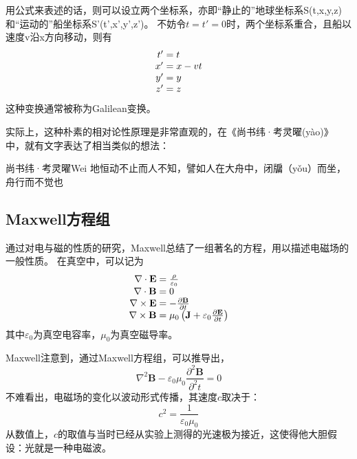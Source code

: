 用公式来表述的话，则可以设立两个坐标系，亦即“静止的”地球坐标系S(t,x,y,z)和“运动的”船坐标系S'(t',x',y',z')。
不妨令$t=t'=0$时，两个坐标系重合，且船以速度v沿x方向移动，则有
\begin{equation}
\begin{array}{r@{}l}
t' &{}= t \\
x' &{}= x-vt\\
y' &{}= y \\
z' &{}= z 
\end{array}\label{eq:galileo}
\end{equation}
这种变换通常被称为Galilean变换。

实际上，这种朴素的相对论性原理是非常直观的，在《尚书纬·考灵曜(y{\` a}o)》中，就有文字表达了相当类似的想法：
\begin{myprop}{尚书纬·考灵曜}{Wei}
地恒动不止而人不知，譬如人在大舟中，闭牖（y{\v o}u）而坐，舟行而不觉也
\end{myprop}

\subsection{Maxwell方程组}
通过对电与磁的性质的研究，Maxwell总结了一组著名的方程，用以描述电磁场的一般性质。
在真空中，可以记为
\begin{equation}
\begin{array}{r@{}l}
\nabla \cdot \mathbf {E} &{}= {\frac {\rho }{\varepsilon _{0}}}\\
\nabla \cdot \mathbf {B} &{}= 0\\
\nabla \times \mathbf {E}&{}=-{\frac {\partial \mathbf {B} }{\partial t}}\\
\nabla \times \mathbf {B}&{}=\mu _{0}\left(\mathbf {J} +\varepsilon _{0}{\frac {\partial \mathbf {E} }{\partial t}}\right)
\end{array}\label{eq:maxwell}
\end{equation}
其中$\varepsilon_0$为真空电容率，$\mu_0$为真空磁导率。

Maxwell注意到，通过Maxwell方程组，可以推导出，
\begin{equation}\label{eq:EMwave}
\nabla ^2 \mathbf {B} - \varepsilon_{0} \mu_0 \frac {\partial^2 \mathbf {B} }{\partial^2 t}= 0
\end{equation}
不难看出，电磁场的变化以波动形式传播，其速度$c$取决于：
\begin{equation}\label{eq:SpeedOfLight}
c^2 = \frac{1}{\varepsilon_0 \mu_0}
\end{equation} 
从数值上，$c$的取值与当时已经从实验上测得的光速极为接近，这使得他大胆假设：光就是一种电磁波。

